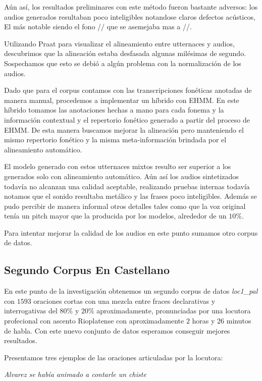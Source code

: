 Aún así, los resultados preliminares con este método fueron bastante adversos: los audios generados resultaban poco inteligibles notandose claros defectos acústicos, El más notable siendo el fono // que se asemejaba mas a //.

Utilizando Praat para visualizar el alineamiento entre utternaces y audios, descubrimos que la alineación estaba desfasada algunas milésimas de segundo. Sospechamos que esto se debió a algún problema con la normalización de los audios.

Dado que para el corpus contamos con las transcripciones fonéticas anotadas de manera manual, procedemos a implementar un híbrido con EHMM. En este híbrido tomamos las anotaciones hechas a mano para cada fonema y la información contextual y el repertorio fonético generado a partir del proceso de EHMM. De esta manera buscamos mejorar la alineación pero manteniendo el mismo repertorio fonético y la misma meta-información brindada por el alineamiento automático.

El modelo generado con estos utternaces mixtos resulto ser superior a los generados solo con alineamiento automático. Aún así los audios sintetizados todavía no alcanzan una calidad aceptable, realizando pruebas internas todavía notamos que el sonido resultaba metálico y las frases poco inteligibles. Además se pudo percibir de manera informal otros detalles tales como que la voz original tenía un pitch mayor que la producida por los modelos, alrededor de un $10\%$.

Para intentar mejorar la calidad de los audios en este punto sumamos otro corpus de datos.

\subsection{Segundo Corpus En Castellano}

En este punto de la investigación obtenemos un segundo corpus de datos \textit{loc1\_pal}\cite{loc1pal} con $1593$ oraciones cortas con una mezcla entre fraces declarativas y interrogativas del $80\%$ y $20\%$ aproximadamente, pronunciadas por una locutora profecional con ascento Rioplatense con aproximadamente $2$ horas y $26$ minutos de habla. Con este nuevo conjunto de datos esperamos conseguir mejores resultados.

Presentamos tres ejemplos de las oraciones articuladas por la locutora:

\indent\indent \textit{Alvarez se había animado a contarle un chiste}

